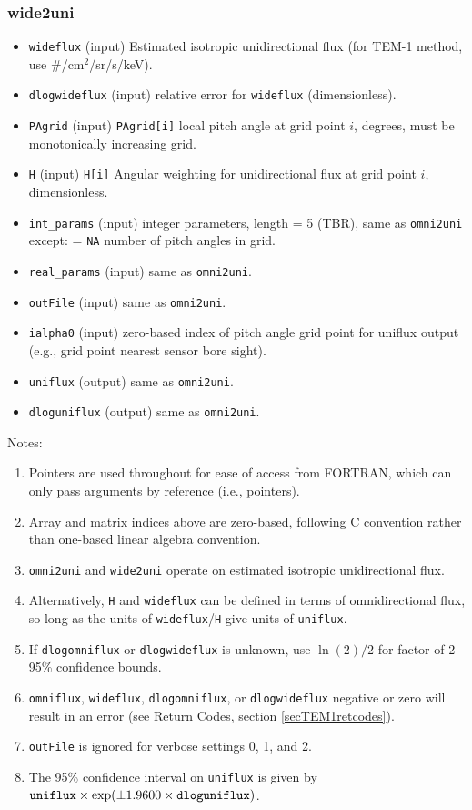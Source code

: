 \documentclass{article}    %
\begin{document}
\subsubsection{wide2uni}
\begin{itemize}
\item \verb|wideflux|  (input) Estimated isotropic unidirectional flux  (for TEM-1 method, use \#/cm$^2$/sr/s/keV).
\item \verb|dlogwideflux| (input) relative error for \verb|wideflux| (dimensionless).
\item \verb|PAgrid| (input) \verb|PAgrid[i]| local pitch angle at grid point $i$, degrees, must be monotonically increasing grid.
\item \verb|H| (input) \verb|H[i]| Angular weighting for unidirectional flux at grid point $i$, dimensionless.
\item \verb|int_params| (input) integer parameters, length = 5 (TBR), same as \verb|omni2uni| except:
\subsubitem[0] = \verb|NA| number of pitch angles in grid.
\item \verb|real_params| (input) same as \verb|omni2uni|.
\item \verb|outFile| (input) same as \verb|omni2uni|.
\item \verb|ialpha0| (input) zero-based index of pitch angle grid point for uniflux output (e.g., grid point nearest sensor bore sight).
\item \verb|uniflux| (output) same as \verb|omni2uni|.
\item \verb|dloguniflux| (output) same as \verb|omni2uni|.
\end{itemize}

Notes: 
\begin{enumerate}
\item Pointers are used throughout for ease of access from FORTRAN, which can only pass arguments by reference (i.e., pointers).
\item Array and matrix indices above are zero-based, following C convention rather than one-based linear algebra convention.
\item \verb|omni2uni| and \verb|wide2uni| operate on estimated isotropic unidirectional flux.
\item Alternatively, \verb|H| and \verb|wideflux| can be defined in terms of omnidirectional flux, so long as
the units of \verb|wideflux|/\verb|H| give units of \verb|uniflux|.
\item If \verb|dlogomniflux| or \verb|dlogwideflux| is unknown, use $\ln(2)/2$ for factor of 2 95\% confidence bounds.
\item \verb|omniflux|, \verb|wideflux|, \verb|dlogomniflux|, or
  \verb|dlogwideflux| negative or zero will result in an error (see
  Return Codes, section \ref{secTEM1retcodes}).
\item \verb|outFile| is ignored for verbose settings 0, 1, and 2.
\item The 95\% confidence interval on \verb|uniflux| is given by $\verb|uniflux|\times\exp(\pm 1.9600\times\verb|dloguniflux|)$.
\end{enumerate}
\end{document}
